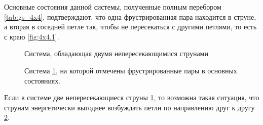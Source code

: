 \documentclass[utf8, babel, sor, jor, amsmath, amssymb, reprint]{elsarticle} %
\begin{document}
Основные состояния данной системы, полученные полным перебором \ref{tab:gs_4x4}, подтверждают, что одна фрустрированная пара находится в струне, а вторая в соседней петле так, чтобы не пересекаться с другими петлями, то есть с краю \ref{fig:4x4.1}.

\begin{figure}[h]
	\centering
	\caption{Система, обладающая двумя непересекающимися струнами}
	\label{fig:4x7}
\end{figure}
\begin{figure}[h]
	\centering
	\caption{Система \ref{fig:4x7}, на которой отмечены фрустрированные пары  в основных состояниях.}
	\label{fig:4x7F}
\end{figure}

Если в системе две непересекающиеся струны \ref{fig:4x7}, то возможна такая ситуация, что струнам энергетически выгоднее возбуждать петли по направлению друг к другу \ref{fig:4x7F}.
\end{document}
